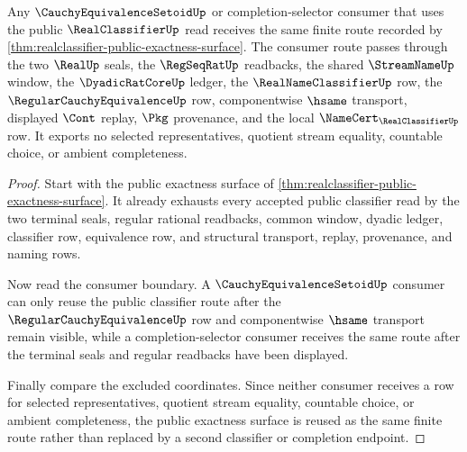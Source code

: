 \begin{theorem}
\label{thm:realclassifier-public-exactness-consumer-reuse}
Any $\CauchyEquivalenceSetoidUp$ or completion-selector consumer that uses the public $\RealClassifierUp$ read receives the same finite route recorded by \autoref{thm:realclassifier-public-exactness-surface}. The consumer route passes through the two $\RealUp$ seals, the $\RegSeqRatUp$ readbacks, the shared $\StreamNameUp$ window, the $\DyadicRatCoreUp$ ledger, the $\RealNameClassifierUp$ row, the $\RegularCauchyEquivalenceUp$ row, componentwise $\hsame$ transport, displayed $\Cont$ replay, $\Pkg$ provenance, and the local $\NameCert_{\RealClassifierUp}$ row. It exports no selected representatives, quotient stream equality, countable choice, or ambient completeness.
\end{theorem}
\begin{proof}
Start with the public exactness surface of \autoref{thm:realclassifier-public-exactness-surface}. It already exhausts every accepted public classifier read by the two terminal seals, regular rational readbacks, common window, dyadic ledger, classifier row, equivalence row, and structural transport, replay, provenance, and naming rows.

Now read the consumer boundary. A $\CauchyEquivalenceSetoidUp$ consumer can only reuse the public classifier route after the $\RegularCauchyEquivalenceUp$ row and componentwise $\hsame$ transport remain visible, while a completion-selector consumer receives the same route after the terminal seals and regular readbacks have been displayed.

Finally compare the excluded coordinates. Since neither consumer receives a row for selected representatives, quotient stream equality, countable choice, or ambient completeness, the public exactness surface is reused as the same finite route rather than replaced by a second classifier or completion endpoint.
\end{proof}


